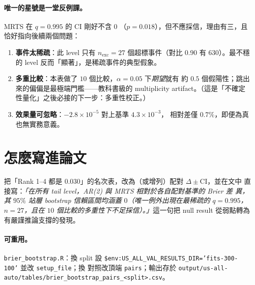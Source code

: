 \documentclass[12pt]{article}
\newcommand{\code}[1]{\texttt{#1}}
\begin{document}
\paragraph{唯一的星號是一堂反例課。}MRTS 在 $q=0.995$ 的 CI 剛好不含 $0$
（$p=0.018$），但不應採信，理由有三，且恰好指向後續兩個問題：
\begin{enumerate}
  \item \textbf{事件太稀疏}：此 level 只有 $n_{\mathrm{exc}}=27$ 個超標事件（對比
        $0.90$ 有 $630$）。最不穩的 level 反而「顯著」，是稀疏事件的典型假象。
  \item \textbf{多重比較}：本表做了 $10$ 個比較，$\alpha=0.05$ 下\emph{期望}就有
        約 $0.5$ 個假陽性；跳出來的偏偏是最極端門檻——教科書級的 multiplicity
        artifact。（這是「不確定性量化」之後必接的下一步：多重性校正。）
  \item \textbf{效果量可忽略}：$-2.8\times10^{-5}$ 對上基準 $4.3\times10^{-3}$，
        相對差僅 $0.7\%$，即便為真也無實務意義。
\end{enumerate}

\section{怎麼寫進論文}

把「Rank 1--4 都是 0.030」的名次表，改為（或增列）配對 $\Delta\pm$CI，並在文中
直接寫：\emph{「在所有 tail level，AR(2) 與 MRTS 相對於各自配對基準的 Brier 差
異，其 $95\%$ 站層 bootstrap 信賴區間均涵蓋 $0$（唯一例外出現在最稀疏的
$q=0.995$，$n=27$，且在 $10$ 個比較的多重性下不足採信）。」}這一句把 null
result 從弱點轉為有嚴謹推論支撐的發現。

\paragraph{可重用。}\code{brier\_bootstrap.R}：換 split 設
\code{\$env:US\_ALL\_VAL\_RESULTS\_DIR='fits-300-100'} 並改 \code{setup\_file}；換
對照改頂端 \code{pairs}；輸出存於
\code{output/us-all-auto/tables/brier\_bootstrap\_pairs\_<split>.csv}。
\end{document}
